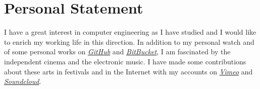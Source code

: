 \section{Personal Statement}
I have a great interest in computer engineering as I have studied and I would like to enrich my working life in this direction. In addition to my personal watch and of some personal works on \href{https://github.com/vlnk}{\textit{GitHub}} and \href{https://bitbucket.org/vlnk}{\textit{BitBucket}}, I am fascinated by the independent cinema and the electronic music. I have made some contributions about these arts in festivals and in the Internet with my accounts on \href{https://vimeo.com/user3599832}{\textit{Vimeo}} and \href{https://soundcloud.com/vlnk}{\textit{Soundcloud}}.
